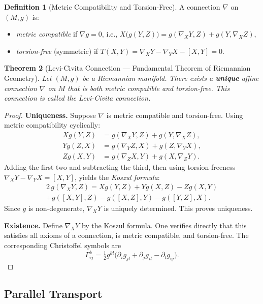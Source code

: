 \documentclass[12pt,a4paper]{amsart}
\newtheorem{theorem}{Theorem}[section]
\theoremstyle{definition}
\newtheorem{definition}[theorem]{Definition}
\begin{document}
\begin{definition}[Metric Compatibility and Torsion-Free]
A connection $\nabla$ on $(M, g)$ is:
\begin{itemize}
  \item \emph{metric compatible} if $\nabla g = 0$, i.e.,
        $X\bigl(g(Y,Z)\bigr) = g(\nabla_X Y, Z) + g(Y, \nabla_X Z)$,
  \item \emph{torsion-free} (symmetric) if $T(X,Y) = \nabla_X Y - \nabla_Y X - [X,Y] = 0$.
\end{itemize}
\end{definition}

\begin{theorem}[Levi-Civita Connection --- Fundamental Theorem of Riemannian Geometry]
\label{thm:levi-civita}
Let $(M, g)$ be a Riemannian manifold. There exists a \textbf{unique} affine
connection $\nabla$ on $M$ that is both metric compatible and torsion-free.
This connection is called the \emph{Levi-Civita connection}.
\end{theorem}

\begin{proof}
\textbf{Uniqueness.} Suppose $\nabla$ is metric compatible and torsion-free.
Using metric compatibility cyclically:
\begin{align*}
  Xg(Y,Z) &= g(\nabla_X Y, Z) + g(Y, \nabla_X Z), \\
  Yg(Z,X) &= g(\nabla_Y Z, X) + g(Z, \nabla_Y X), \\
  Zg(X,Y) &= g(\nabla_Z X, Y) + g(X, \nabla_Z Y).
\end{align*}
Adding the first two and subtracting the third, then using torsion-freeness
$\nabla_X Y - \nabla_Y X = [X,Y]$, yields the \emph{Koszul formula}:
\begin{multline*}
  2\,g(\nabla_X Y, Z) = Xg(Y,Z) + Yg(X,Z) - Zg(X,Y) \\
    + g([X,Y], Z) - g([X,Z], Y) - g([Y,Z], X).
\end{multline*}
Since $g$ is non-degenerate, $\nabla_X Y$ is uniquely determined. This proves
uniqueness.

\textbf{Existence.} Define $\nabla_X Y$ by the Koszul formula. One verifies
directly that this satisfies all axioms of a connection, is metric compatible,
and torsion-free. The corresponding Christoffel symbols are
\[
  \Gamma^k_{ij} = \tfrac{1}{2} g^{kl}
  \bigl(\partial_i g_{jl} + \partial_j g_{il} - \partial_l g_{ij}\bigr).
\]
\end{proof}

\subsection{Parallel Transport}
\end{document}
